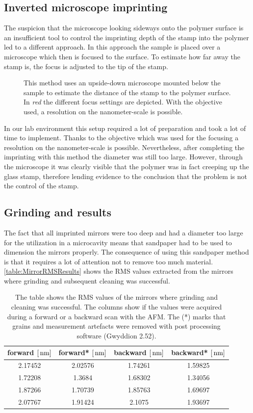 \subsection{Inverted microscope imprinting}
The suspicion that the microscope looking sideways onto the polymer surface is an insufficient tool to control the imprinting depth of the stamp into the polymer led to a different approach. In this approach the sample is placed over a microscope which then is focused to the surface. To estimate how far away the stamp is, the focus is adjusted to the tip of the stamp.

\begin{figure}[H]
	
	\caption{This method uses an upside-down microscope mounted below the sample to estimate the distance of the stamp to the polymer surface. In \textit{red} the different focus settings are depicted. With the objective used, a resolution on the nanometer-scale is possible.}
\end{figure}
In our lab environment this setup required a lot of preparation and took a lot of time to implement. Thanks to the objective which was used for the focusing a resolution on the nanometer-scale is possible. Nevertheless, after completing the imprinting with this method the diameter was still too large. However, through the microscope it was clearly visible that the polymer was in fact creeping up the glass stamp, therefore lending evidence to the conclusion that the problem is not the control of the stamp.

\subsection{Grinding and results}
The fact that all imprinted mirrors were too deep and had a diameter too large for the utilization in a microcavity means that sandpaper had to be used to dimension the mirrors properly. The consequence of using this sandpaper method is that it requires a lot of attention not to remove too much material. \autoref{table:MirrorRMSResults} shows the RMS values extracted from the mirrors where grinding and subsequent cleaning was successful.

\begin{table}[H]
	\begin{tabular}{cccc}
	\hline
	\textbf{forward $[\,\text{nm}]$} & \textbf{forward* $[\,\text{nm}]$} & \textbf{backward $[\,\text{nm}]$} & \textbf{backward* $[\,\text{nm}]$} \\
	\hline
	2.17452 & 2.02576 & 1.74261 & 1.59825 \\
	1.72208 & 1.3684 & 1.68302 & 1.34056 \\
	1.87266 & 1.70739 & 1.85763 & 1.69697 \\
	2.07767 & 1.91424 & 2.1075 & 1.93697 \\
	\hline
	\end{tabular}
	\caption{The table shows the RMS values of the mirrors where grinding and cleaning was successful. The columns show if the values were acquired during a forward or a backward scan with the AFM. The (*) marks that grains and measurement artefacts were removed with post processing software (Gwyddion 2.52).}
	\label{table:MirrorRMSResults}
\end{table}

